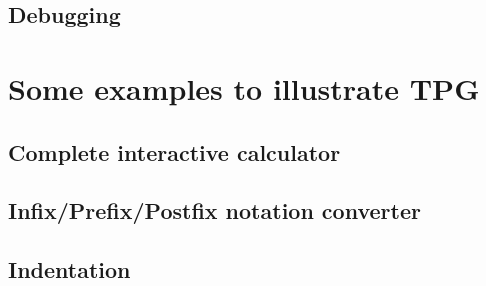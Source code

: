 \documentclass[a4paper,twoside]{report}
\begin{document}
    \chapter{Debugging}
        

\cleardoublepage
\part{Some examples to illustrate TPG}                      \label{tpg:examples}
    \chapter{Complete interactive calculator}
        
    \chapter{Infix/Prefix/Postfix notation converter}
        
    \chapter{Indentation}
        
\end{document}
